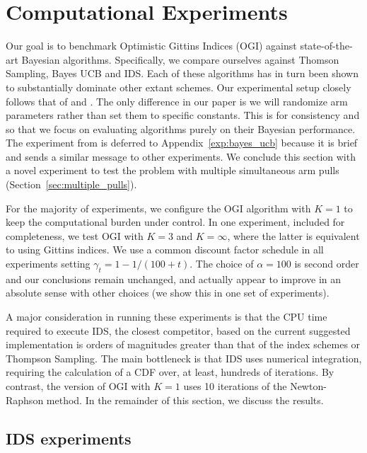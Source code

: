 \section{Computational Experiments} \label{sec:experiments}
Our goal is to benchmark Optimistic Gittins Indices (OGI) against state-of-the-art Bayesian algorithms. Specifically, we compare ourselves against Thomson Sampling, Bayes UCB and IDS. Each of these algorithms has in turn been shown to substantially dominate other extant schemes. Our experimental setup closely follows that of \cite{russo2014learning,kaufmann2012thompson} and \cite{chapelle2011empirical}. The only difference in our paper is we will randomize arm parameters rather than set them to specific constants. This is for consistency and so that we focus on evaluating algorithms purely on their Bayesian performance. The experiment from \cite{kaufmann2012thompson} is deferred to Appendix~\ref{exp:bayes_ucb} because it is brief and sends a similar message to other experiments. We conclude this section with a novel experiment to test the problem with multiple simultaneous arm pulls (Section~\ref{sec:multiple_pulls}).

For the majority of experiments, we configure the OGI algorithm with $K =1$ to keep the computational burden under control. In one experiment, included for completeness, we test OGI with $K = 3$ and $K=\infty$, where the latter is equivalent to using Gittins indices. We use a common discount factor schedule in all experiments setting $\gamma_t = 1 - 1/(100 + t)$. The choice of $\alpha = 100$ is second order and our conclusions remain unchanged, and actually appear to improve in an absolute sense with other choices (we show this in one set of experiments). 

A major consideration in running these experiments is that the CPU time required to execute IDS, the closest competitor, based on the current suggested implementation is orders of magnitudes greater than that of the index schemes or Thompson Sampling. The main bottleneck is that IDS uses numerical integration,  requiring the calculation of a CDF over, at least, hundreds of iterations. By contrast, the version of OGI with $K=1$ uses 10 iterations of the Newton-Raphson method. In the remainder of this section, we discuss the results.

\subsection{IDS experiments}

